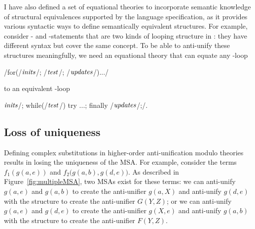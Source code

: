 


I have also defined a set of equational theories to incorporate semantic knowledge of structural equivalences supported by the  language specification, as it provides various syntactic ways to define semantically equivalent structures.
For example, consider - and -statements that are two kinds of looping structure in : they have different syntax but cover the same concept. To be able to anti-unify these structures meaningfully, we need an equational theory that can equate any -loop
\begin{center}
\code/for(/$\mathit{inits}$\code/; /$\mathit{test}$\code/; /$\mathit{updates}$\code/){...}/
\end{center}
to an equivalent -loop
\begin{center}
$\mathit{inits}$\code/; while(/$\mathit{test}$\code/) {try {...;} finally {/$\mathit{updates}$\code/;}}/.
\end{center}

\subsection{Loss of uniqueness}
Defining complex substitutions in higher-order anti-unification modulo theories results in losing the uniqueness of the MSA. For example, consider the terms $f_1(g(a,e))$ and $f_2(g(a,b),$\linebreak$g(d,e))$. As described in Figure~\ref{fig:multipleMSA}, two MSAs exist for these terms: we can anti-unify $g(a,e)$ and $g(a,b)$ to create the anti-unifier $g(a,X)$ and anti-unify $g(d,e)$ with the \NIL{} structure to create the anti-unifier $G(Y,Z)$; or we can anti-unify $g(a,e)$ and $g(d,e)$ to create the anti-unifier $g(X,e)$ and anti-unify $g(a,b)$ with the \NIL{} structure to create the anti-unifier $F(Y,Z)$.

